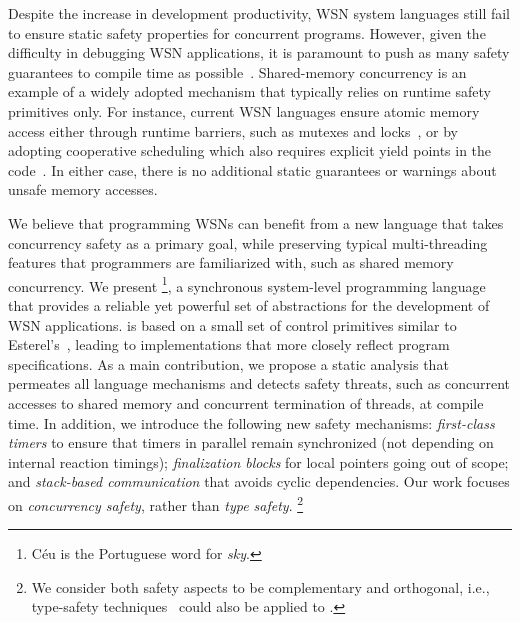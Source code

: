 Despite the increase in development productivity, WSN system languages still 
fail to ensure static safety properties for concurrent programs.
%
However, given the difficulty in debugging WSN applications, it is paramount to 
push as many safety guarantees to compile time as possible~\cite{wsn.decade}.
%
Shared-memory concurrency is an example of a widely adopted mechanism that 
typically relies on runtime safety primitives only.
For instance, current WSN languages ensure atomic memory access either through 
runtime barriers, such as mutexes and 
locks~\cite{wsn.mantisos,wsn.tinythreads}, or by adopting cooperative 
scheduling which also requires explicit yield points in the 
code~\cite{wsn.sol,wsn.protothreads}.
In either case, there is no additional static guarantees or warnings about 
unsafe memory accesses.

We believe that programming WSNs can benefit from a new language that takes 
concurrency safety as a primary goal, while preserving typical multi-threading 
features that programmers are familiarized with, such as shared memory 
concurrency.
%
We present \CEU%
\footnote{C\'eu is the Portuguese word for \emph{sky}.},
a synchronous system-level programming language that provides a reliable yet 
powerful set of abstractions for the development of WSN applications.
%
\CEU is based on a small set of control primitives similar to 
Esterel's~\cite{esterel.ieee91}, leading to implementations that more closely 
reflect program specifications.
%
As a main contribution, we propose a static analysis that permeates all 
language mechanisms and detects safety threats, such as concurrent accesses to 
shared memory and concurrent termination of threads, at compile time.
%
In addition, we introduce the following new safety mechanisms:
\emph{first-class timers} to ensure that timers in parallel remain synchronized 
(not depending on internal reaction timings);
\emph{finalization blocks} for local pointers going out of scope;
and \emph{stack-based communication} that avoids cyclic dependencies.
%
Our work focuses on \emph{concurrency safety}, rather than \emph{type safety}.%
\footnote{
We consider both safety aspects to be complementary and orthogonal, i.e., 
type-safety techniques~\cite{wsn.safety} could also be applied to \CEU.
}

